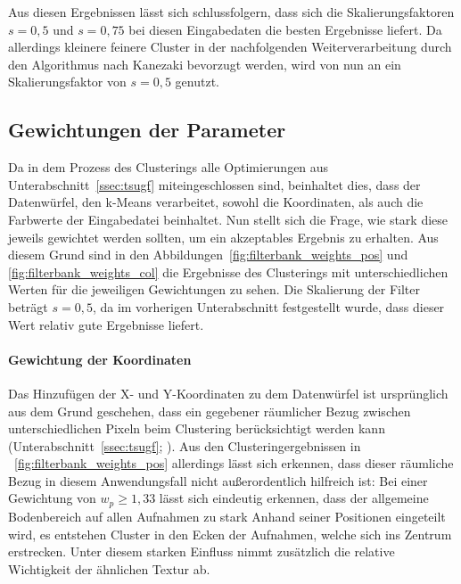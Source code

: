 Aus diesen Ergebnissen lässt sich schlussfolgern, dass sich die Skalierungsfaktoren $s=0,5$ und $s=0,75$ bei diesen Eingabedaten die besten Ergebnisse liefert. Da allerdings kleinere \bzw feinere Cluster in der nachfolgenden Weiterverarbeitung durch den Algorithmus nach Kanezaki bevorzugt werden, wird von nun an ein Skalierungsfaktor von $s=0,5$ genutzt.

\subsection{Gewichtungen der Parameter}
\label{ssec:initialization_filterweight}

Da in dem Prozess des Clusterings alle Optimierungen aus Unterabschnitt~\ref{ssec:tsugf} miteingeschlossen sind, beinhaltet dies, dass der Datenwürfel, den k-Means verarbeitet, sowohl die Koordinaten, als auch die Farbwerte der Eingabedatei beinhaltet. Nun stellt sich die Frage, wie stark diese jeweils gewichtet werden sollten, um ein akzeptables Ergebnis zu erhalten. Aus diesem Grund sind in den Abbildungen~\ref{fig:filterbank_weights_pos} und \ref{fig:filterbank_weights_col} die Ergebnisse des Clusterings mit unterschiedlichen Werten für die jeweiligen Gewichtungen zu sehen. Die Skalierung der Filter beträgt $s=0,5$, da im vorherigen Unterabschnitt festgestellt wurde, dass dieser Wert relativ gute Ergebnisse liefert.

\paragraph{Gewichtung der Koordinaten}
Das Hinzufügen der X- und Y-Koordinaten zu dem Datenwürfel ist ursprünglich aus dem Grund geschehen, dass ein gegebener räumlicher Bezug zwischen unterschiedlichen Pixeln beim Clustering berücksichtigt werden kann (\vgl Unterabschnitt~\ref{ssec:tsugf}; \cite{jain_91}). Aus den Clusteringergebnissen in \figurename~\ref{fig:filterbank_weights_pos} allerdings lässt sich erkennen, dass dieser räumliche Bezug in diesem Anwendungsfall nicht außerordentlich hilfreich ist: Bei einer Gewichtung von $w_p\geq1,33$ lässt sich eindeutig erkennen, dass der allgemeine Bodenbereich auf allen Aufnahmen zu stark Anhand seiner Positionen eingeteilt wird, es entstehen Cluster in den Ecken der Aufnahmen, welche sich ins Zentrum erstrecken. Unter diesem starken Einfluss nimmt zusätzlich die relative Wichtigkeit der ähnlichen Textur ab.

